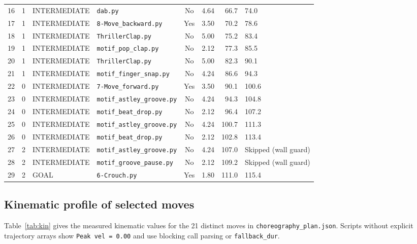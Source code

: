 \documentclass[11pt,a4paper]{article}
\newcommand{\code}[1]{\texttt{#1}}
\begin{document}
{\begin{longtable}{r c l l c r r l}
  16 & 1 & INTERMEDIATE & \code{dab.py}                 & No  & 4.64  & 66.7  & 74.0 \\
  17 & 1 & INTERMEDIATE & \code{8-Move\_backward.py}    & Yes & 3.50  & 70.2  & 78.6 \\
  18 & 1 & INTERMEDIATE & \code{ThrillerClap.py}        & No  & 5.00  & 75.2  & 83.4 \\
  19 & 1 & INTERMEDIATE & \code{motif\_pop\_clap.py}    & No  & 2.12  & 77.3  & 85.5 \\
  20 & 1 & INTERMEDIATE & \code{ThrillerClap.py}        & No  & 5.00  & 82.3  & 90.1 \\
  21 & 1 & INTERMEDIATE & \code{motif\_finger\_snap.py} & No  & 4.24  & 86.6  & 94.3 \\
  22 & 0 & INTERMEDIATE & \code{7-Move\_forward.py}     & Yes & 3.50  & 90.1  & 100.6 \\
  23 & 0 & INTERMEDIATE & \code{motif\_astley\_groove.py}& No & 4.24  & 94.3  & 104.8 \\
  24 & 0 & INTERMEDIATE & \code{motif\_beat\_drop.py}   & No  & 2.12  & 96.4  & 107.2 \\
  25 & 0 & INTERMEDIATE & \code{motif\_astley\_groove.py}& No & 4.24  & 100.7 & 111.3 \\
  26 & 0 & INTERMEDIATE & \code{motif\_beat\_drop.py}   & No  & 2.12  & 102.8 & 113.4 \\
  27 & 2 & INTERMEDIATE & \code{motif\_astley\_groove.py}& No & 4.24  & 107.0 & Skipped (wall guard) \\
  28 & 2 & INTERMEDIATE & \code{motif\_groove\_pause.py}& No  & 2.12  & 109.2 & Skipped (wall guard) \\
  29 & 2 & GOAL         & \code{6-Crouch.py}            & Yes & 1.80  & 111.0 & 115.4 \\
\end{longtable}
}

\clearpage
\subsection{Kinematic profile of selected moves}

Table~\ref{tab:kin} gives the measured kinematic values for the 21 distinct moves in \code{choreography\_plan.json}. Scripts without explicit trajectory arrays show \code{Peak vel = 0.00} and use blocking call parsing or \code{fallback\_dur}.
\end{document}
